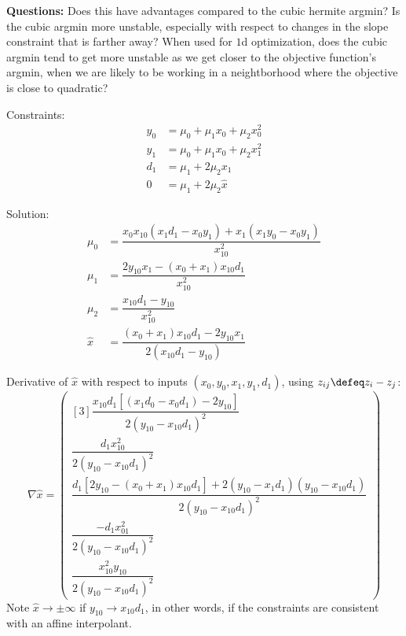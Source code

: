 \textbf{Questions:}
Does this have advantages compared to the cubic hermite argmin?
Is the cubic argmin more
unstable, especially with respect to changes in the
slope constraint that is farther away?
When used for $1$d optimization,
does the cubic argmin tend to get more unstable as we get closer
to the objective function's argmin, 
when we are likely to be working in a neightborhood where
the objective is close to quadratic?

\newpage 

Constraints:
\begin{align}
y_0 & = \mu_0+\mu_1 x_0+\mu_2 x_0^{2}  
\\
y_1 & = \mu_0+\mu_1 x_0+\mu_2 x_1^{2}  
\nonumber
\\
d_1 & = \mu_1 + 2 \mu_2 x_1  
\nonumber
\\
0 & = \mu_1 + 2 \mu_2 \hat{x}  
\nonumber
\end{align}

Solution:
\begin{align}
\mu_0 & =
\dfrac{
x_0 x_{10} \left( x_1 d_1 - x_0 y_1 \right) 
+ x_1 \left( x_1 y_0 - x_0 y_1 \right)
}{x_{10}^{2}}
\\
\mu_1 & =
\dfrac{2 y_{10} x_1 - \left(x_0+x_1\right) x_{10} d_1}{x_{10}^{2}}
\nonumber
\\
\mu_2 & = \dfrac{x_{10} d_1 - y_{10}}{x_{10}^{2}}
\nonumber 
\\
\hat{x} & =
\dfrac{
\left(x_0+x_1\right) x_{10} d_1 - 2 y_{10} x_1
}{2 \left( x_{10} d_1 - y_{10} \right)}
\nonumber 
\end{align}

\newpage

Derivative of $\hat{x}$ with respect to inputs
$(x_0,y_0,x_1,y_1,d_1)$,
using $z_{ij} \defeq z_i - z_j$:
\begin{equation}
\nabla \hat{x} =
\begin{pmatrix}[3]
\dfrac{
x_{10} d_1 \left[ \left(x_1 d_0 - x_0 d_1 \right) -2 y_{10}\right]
}{
2 \left(y_{10} - x_{10} d_1\right)^{2}
}
\\
\dfrac{
d_1 x_{10}^{2}
}{
2 \left(y_{10} - x_{10} d_1\right)^{2}
} 
\\
\dfrac{
d_1 \left[ 2 y_{10} - \left( x_0 + x_1 \right) x_{10} d_1 \right]
+
2 
\left(y_{10} - x_1 d_1 \right) \left( y_{10} - x_{10} d_1 \right)
}{
2 \left(y_{10} - x_{10} d_1\right)^{2}
}
\\
\dfrac{
-d_1 x_{01}^{2}
}{
2 \left(y_{10} - x_{10} d_1\right)^{2}
}
\\ 
\dfrac{x_{10}^{2} y_{10}}{
2 \left(y_{10} - x_{10} d_1\right)^{2}
}
\end{pmatrix}
\end{equation}
Note $\hat{x} \to \pm \infty$ if $y_{10} \to x_{10} d_1$,
in other words, if the constraints are consistent with an
affine interpolant.


